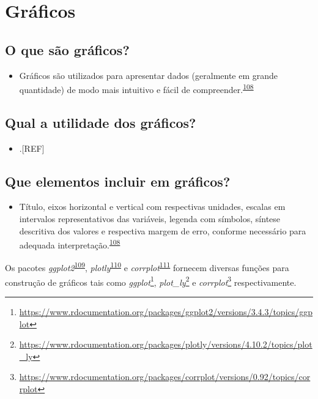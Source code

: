 \documentclass[
  a4paper,
]{book}
\providecommand{\tightlist}{%
  \setlength{\itemsep}{0pt}\setlength{\parskip}{0pt}}
\renewcommand{\href}[2]{#2\footnote{\url{#1}}}
\newenvironment{infobox}[1]
  {
  \begin{itemize}
  \renewcommand{\labelitemi}{
    \raisebox{-.7\height}[0pt][0pt]{
      {\setkeys{Gin}{width=3em,keepaspectratio}
        \texttt{[image: \#1]}}
    }
  }
  \setlength{\fboxsep}{1em}
  \begin{blackbox}
  \item
  }
  {
  \end{blackbox}
  \end{itemize}
  }
\begin{document}
\hypertarget{graficos}{%
\section{Gráficos}\label{graficos}}

\hypertarget{o-que-suxe3o-gruxe1ficos}{%
\subsection{O que são gráficos?}\label{o-que-suxe3o-gruxe1ficos}}

\begin{itemize}
\tightlist
\item
  Gráficos são utilizados para apresentar dados (geralmente em grande quantidade) de modo mais intuitivo e fácil de compreender.\textsuperscript{\protect\hyperlink{ref-Park2022}{108}}
\end{itemize}

\hypertarget{qual-a-utilidade-dos-gruxe1ficos}{%
\subsection{Qual a utilidade dos gráficos?}\label{qual-a-utilidade-dos-gruxe1ficos}}

\begin{itemize}
\tightlist
\item
  .{[}REF{]}
\end{itemize}

\hypertarget{que-elementos-incluir-em-gruxe1ficos}{%
\subsection{Que elementos incluir em gráficos?}\label{que-elementos-incluir-em-gruxe1ficos}}

\begin{itemize}
\tightlist
\item
  Título, eixos horizontal e vertical com respectivas unidades, escalas em intervalos representativos das variáveis, legenda com símbolos, síntese descritiva dos valores e respectiva margem de erro, conforme necessário para adequada interpretação.\textsuperscript{\protect\hyperlink{ref-Park2022}{108}}
\end{itemize}

\begin{infobox}{images/Rlogo}
Os pacotes \emph{ggplot2}\textsuperscript{\protect\hyperlink{ref-ggplot2}{109}}, \emph{plotly}\textsuperscript{\protect\hyperlink{ref-plotly}{110}} e \emph{corrplot}\textsuperscript{\protect\hyperlink{ref-corrplot}{111}} fornecem diversas funções para construção de gráficos tais como \href{https://www.rdocumentation.org/packages/ggplot2/versions/3.4.3/topics/ggplot}{\emph{ggplot}}, \href{https://www.rdocumentation.org/packages/plotly/versions/4.10.2/topics/plot_ly}{\emph{plot\_ly}} e \href{https://www.rdocumentation.org/packages/corrplot/versions/0.92/topics/corrplot}{\emph{corrplot}} respectivamente.

\end{infobox}
\end{document}
